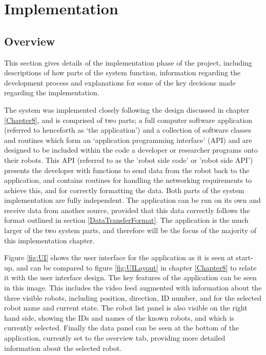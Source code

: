 
\chapter[Implementation]{Implementation} %

\label{Chapter9} %


\section{Overview}
This section gives details of the implementation phase of the project, including descriptions of how parts of the system function, information regarding the development process and explanations for some of the key decisions made regarding the implementation.

The system was implemented closely following the design discussed in chapter \ref{Chapter8}, and is comprised of two parts; a full computer software application (referred to henceforth as `the application') and a collection of software classes and routines which form an `application programming interface' (API) and are designed to be included within the code a developer or researcher programs onto their robots. This API (referred to as the 'robot side code' or 'robot side API') presents the developer with functions to send data from the robot back to the application, and contains routines for handling the networking requirements to achieve this, and for correctly formatting the data. Both parts of the system implementation are fully independent. The application can be run on its own and receive data from another source, provided that this data correctly follows the format outlined in section \ref{DataTransferFormat}. The application is the much larger of the two system parts, and therefore will be the focus of the majority of this implementation chapter. 

Figure \ref{fig:UI} shows the user interface for the application as it is seen at start-up, and can be compared to figure \ref{fig:UILayout} in chapter \ref{Chapter8} to relate it with the user interface design. The key features of the application can be seen in this image. This includes the video feed augmented with information about the three visible robots, including position, direction, ID number, and for the selected robot name and current state. The robot list panel is also visible on the right hand side, showing the IDs and names of the known robots, and which is currently selected. Finally the data panel can be seen at the bottom of the application, currently set to the overview tab, providing more detailed information about the selected robot.

